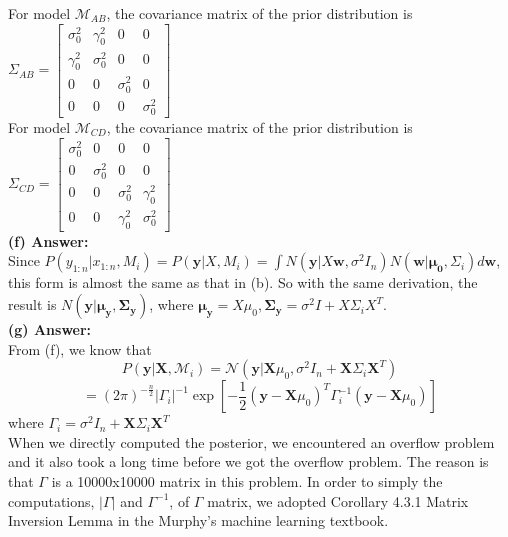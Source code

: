 \documentclass{article}
\begin{document}
\noindent
For model $\mathcal{M}_{AB}$, the covariance matrix of the prior distribution is 
$\Sigma_{AB} =
\begin{bmatrix}
 \sigma_0^2 & \gamma_0^2 & 0 & 0\\ 
 \gamma_0^2 & \sigma_0^2 & 0 & 0\\ 
 0 & 0 & \sigma_0^2 & 0\\ 
 0 & 0 & 0 & \sigma_0^2
\end{bmatrix}$\\

\noindent
For model $\mathcal{M}_{CD}$, the covariance matrix of the prior distribution is 
$\Sigma_{CD} =
\begin{bmatrix}
 \sigma_0^2 & 0 & 0 & 0\\ 
 0 & \sigma_0^2 & 0 & 0\\ 
 0 & 0 & \sigma_0^2 & \gamma_0^2\\ 
 0 & 0 & \gamma_0^2 & \sigma_0^2
\end{bmatrix}$\\

\noindent
\textbf{(f) Answer:}\\
Since $P(y_{1:n}|x_{1:n},M_i) = P(\mathbf{y}|X,M_i) = \int N(\mathbf{y}|X \mathbf{w},\sigma^2 I_n) N(\mathbf{w}|\mathbf{\mu_0},\Sigma_i) d \mathbf{w}$, this form is almost the same as that in (b). So with the same derivation, the result is $N(\mathbf{y}|\mathbf{\mu_y, \Sigma_y})$, where $\mathbf{\mu_y} = X\mu_0, \mathbf{\Sigma_y} = \sigma^2 I + X \Sigma_i X^T$.\\

\noindent
\textbf{(g) Answer:}\\
From (f), we know that\\
$$P(\mathbf{y} | \textbf{X}, \mathcal{M}_i) = \mathcal{N}(\mathbf y | \textbf{X}{\mu_0}, \sigma^2I_n + \textbf{X}\Sigma_i\textbf{X}^T)$$
$$=(2\pi)^{-\frac{n}{2}} |\Gamma_i|^{-1} \exp[-\frac{1}{2}(\mathbf y - \textbf{X}\mu_0)^T\Gamma_i^{-1}(\mathbf y - \textbf{X}\mu_0)]$$
where $\Gamma_i = \sigma^2I_n + \textbf{X}\Sigma_i\textbf{X}^T$\\

\noindent
When we directly computed the posterior, we encountered an overflow problem and it also took a long time before we got the overflow problem. The reason is that $\Gamma$ is a 10000x10000 matrix in this problem. In order to simply the computations, $|\Gamma|$ and $\Gamma^{-1}$, of $\Gamma$ matrix, we adopted Corollary 4.3.1 Matrix Inversion Lemma in the Murphy's machine learning textbook.\\
\end{document}
